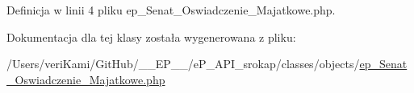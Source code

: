 Definicja w linii 4 pliku ep\-\_\-\-Senat\-\_\-\-Oswiadczenie\-\_\-\-Majatkowe.\-php.



Dokumentacja dla tej klasy została wygenerowana z pliku\-:\begin{DoxyCompactItemize}
\item 
/\-Users/veri\-Kami/\-Git\-Hub/\-\_\-\-\_\-\-E\-P\-\_\-\-\_\-/e\-P\-\_\-\-A\-P\-I\-\_\-srokap/classes/objects/\hyperlink{ep___senat___oswiadczenie___majatkowe_8php}{ep\-\_\-\-Senat\-\_\-\-Oswiadczenie\-\_\-\-Majatkowe.\-php}\end{DoxyCompactItemize}
